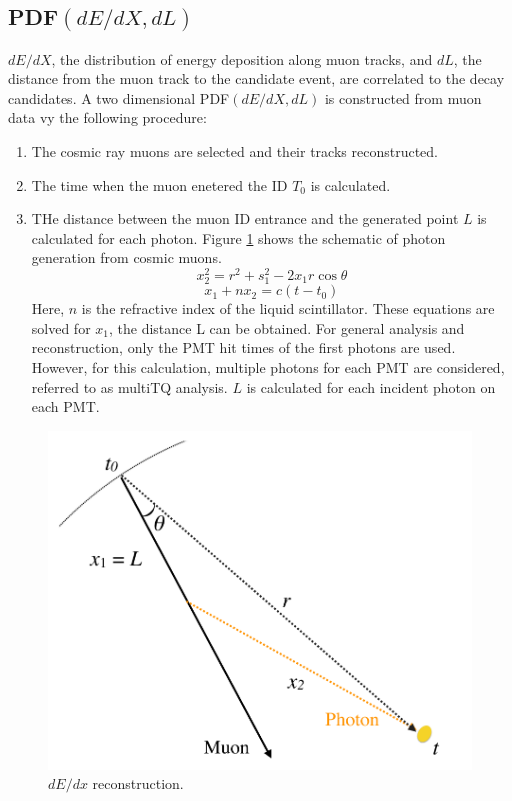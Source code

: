 \subsection*{PDF$(dE/dX,dL)$}
$dE/dX$, the distribution of energy deposition along muon tracks, and $dL$, the distance from the muon track to the candidate event, are correlated to the decay candidates. A two dimensional PDF$(dE/dX,dL)$ is constructed from muon data vy the following procedure:
\begin{enumerate}
	\item The cosmic ray muons are selected and their tracks reconstructed.
	\item The time when the muon enetered the ID $T_0$ is calculated.
	\item THe distance between the muon ID entrance and the generated point $L$ is calculated for each photon. Figure \ref{fig:showerphoton} shows the schematic of photon generation from cosmic muons. 
	\begin{equation}
		x^2_2=r^2+s^2_1-2x_1r\cos\theta
	\end{equation}
	\begin{equation}
		x_1+nx_2=c(t-t_0)
	\end{equation}
	Here, $n$ is the refractive index of the liquid scintillator. These equations are solved for $x_1$, the distance L can be obtained. For general analysis and reconstruction, only the PMT hit times of the first photons are used. However, for this calculation, multiple photons for each PMT are considered, referred to as multiTQ analysis. $L$ is calculated for each incident photon on each PMT. 
\end{enumerate}

\begin{figure}[htb]
	\centering
	\includegraphics[scale=0.35]{showerphoton.png}
	\caption{$dE/dx$ reconstruction.}
	\label{fig:showerphoton}
\end{figure}

